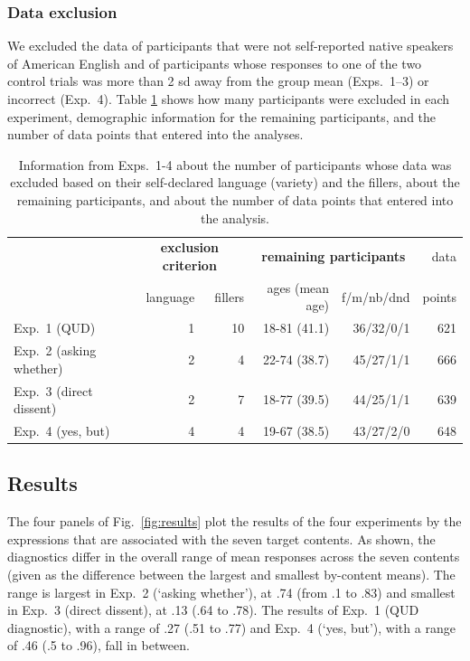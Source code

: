 \documentclass[times,linguex]{glossa}
\begin{document}
\subsubsection{Data exclusion}

We excluded the data of participants that were not self-reported native speakers of American English and of participants whose responses to one of the two control trials was more than 2 sd away from the group mean (Exps.~1--3) or incorrect (Exp.~4). Table \ref{t:excluded} shows how many participants were excluded in each experiment, demographic information for the remaining participants, and the number of data points that entered into the analyses.

\begin{table}[h!]
  \centering
  \begin{tabular}{l | r r | r r  | r }
    & \multicolumn{2}{c|}{\bf exclusion criterion} & \multicolumn{2}{c|}{\bf remaining participants} & data \\ 
    & language & fillers & ages (mean age) & f/m/nb/dnd &  points \\ \hline
    Exp.~1 (QUD)   & 1 &  10 &  18-81 (41.1) & 36/32/0/1 & 621 \\ 
    Exp.~2 (asking whether) &  2 &  4 & 22-74 (38.7) & 45/27/1/1 & 666 \\ 
    Exp.~3 (direct dissent) &  2 &  7 & 18-77 (39.5) & 44/25/1/1  & 639 \\ 
    Exp.~4 (yes, but) & 4 & 4 & 19-67 (38.5)  & 43/27/2/0 & 648 \\ 
    \hline
  \end{tabular}
  \caption{Information from Exps.~1-4 about the number of participants whose data was excluded based on their self-declared language (variety) and the fillers, about the remaining participants, and about the number of data points that entered into the analysis.}\label{t:excluded}
\end{table}

\subsection{Results}
The four panels of Fig.~\ref{fig:results} plot the results of the four experiments by the expressions that are associated with the seven target contents. %
As shown, the diagnostics differ in the overall range of mean responses across the seven contents (given as the difference between the largest and smallest by-content means). The range is largest in Exp.~2 (`asking whether'), at .74 (from .1 to .83) and smallest in Exp.~3 (direct dissent), at .13 (.64 to .78). The results of Exp.~1 (QUD diagnostic), with a range of .27 (.51 to .77) and Exp.~4 (`yes, but'), with a range of .46 (.5 to .96), fall in between.
\end{document}
